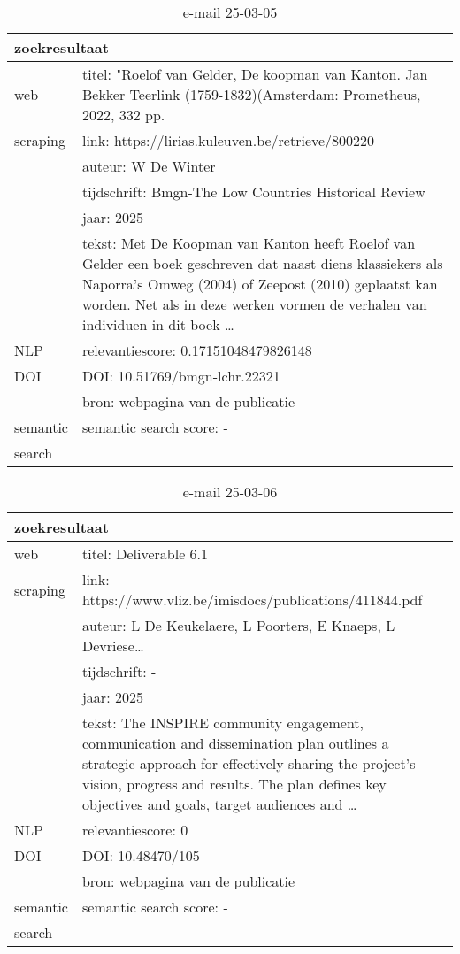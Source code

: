 \begin{table}[h!]
    \caption{e-mail 25-03-05}
    \centering
    \begin{tabularx}{\textwidth}{|p{4cm}|X|} 
        \hline
        \multicolumn{2}{|X|}{\textbf{zoekresultaat}} \\
        \hline
        web &titel:  "Roelof van Gelder, De koopman van Kanton. Jan Bekker Teerlink (1759-1832)(Amsterdam: Prometheus, 2022, 332 pp.\\
        scraping&link: https://lirias.kuleuven.be/retrieve/800220\\
        &auteur: W De Winter\\
        &tijdschrift: Bmgn-The Low Countries Historical Review\\
        &jaar: 2025\\
        &tekst: Met De Koopman van Kanton heeft Roelof van Gelder een boek geschreven dat naast diens klassiekers als Naporra’s Omweg (2004) of Zeepost (2010) geplaatst kan worden. Net als in deze werken vormen de verhalen van individuen in dit boek …\\
        \hline
        NLP&relevantiescore: 0.17151048479826148\\
        \hline
        DOI&DOI: 10.51769/bmgn-lchr.22321\\
        &bron: webpagina van de publicatie\\
        \hline
        semantic&semantic search score: -\\
        search&\\
        \hline
    \end{tabularx}
    \label{table:email20250305}
\end{table}
\begin{table}[h!]
    \caption{e-mail 25-03-06}
    \centering
    \begin{tabularx}{\textwidth}{|p{4cm}|X|} 
        \hline
        \multicolumn{2}{|X|}{\textbf{zoekresultaat}} \\
        \hline
        web &titel: Deliverable 6.1\\
        scraping&link: https://www.vliz.be/imisdocs/publications/411844.pdf\\
        &auteur: L De Keukelaere, L Poorters, E Knaeps, L Devriese…\\
        &tijdschrift: -\\
        &jaar: 2025\\
        &tekst: The INSPIRE community engagement, communication and dissemination plan outlines a strategic approach for effectively sharing the project’s vision, progress and results. The plan defines key objectives and goals, target audiences and …\\
        \hline
        NLP&relevantiescore: 0\\
        \hline
        DOI&DOI: 10.48470/105\\
        &bron: webpagina van de publicatie\\
        \hline
        semantic&semantic search score: -\\
        search&\\
        \hline
    \end{tabularx}
    \label{table:email20250306}
\end{table}
